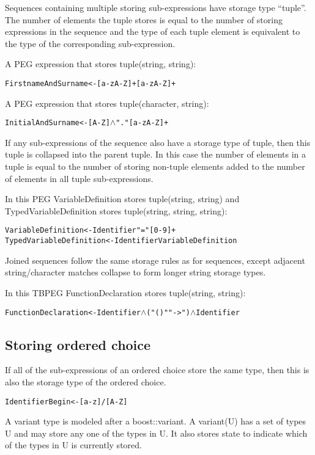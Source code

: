 \documentclass[a4paper,11pt]{article}
\begin{document}
Sequences containing multiple storing sub-expressions have storage type ``tuple''.
The number of elements the tuple stores is equal to the number of storing expressions in the sequence and the type of each tuple element is equivalent to the type of the corresponding sub-expression.

A PEG expression that stores tuple(string, string):
\begin{alltt}
    FirstnameAndSurname <- [a-zA-Z]+ [a-zA-Z]+
\end{alltt}

A PEG expression that stores tuple(character, string):
\begin{alltt}
    InitialAndSurname <- [A-Z] \(\wedge\) "." [a-zA-Z]+
\end{alltt}

If any sub-expressions of the sequence also have a storage type of tuple, then this tuple is collapsed into the parent tuple.
In this case the number of elements in a tuple is equal to the number of storing non-tuple elements added to the number of elements in all tuple sub-expressions.

In this PEG VariableDefinition stores tuple(string, string) and TypedVariableDefinition stores tuple(string, string, string):
\begin{alltt}
    VariableDefinition      <- Identifier "=" [0-9]+
    TypedVariableDefinition <- Identifier VariableDefinition
\end{alltt}

Joined sequences follow the same storage rules as for sequences, except adjacent string/character matches collapse to form longer string storage types.

In  this TBPEG FunctionDeclaration stores tuple(string, string):
\begin{alltt}
    FunctionDeclaration <- Identifier \(\wedge\) ("()"  "->") \(\wedge\) Identifier
\end{alltt}

\subsection{Storing ordered choice}
If all of the sub-expressions of an ordered choice store the same type, then this is also the storage type of the ordered choice.
\begin{alltt}
    IdentifierBegin <- [a-z] / [A-Z]
\end{alltt}

A variant type is modeled after a boost::variant\cite{boostvariant}.
A variant(U) has a set of types U and may store any one of the types in U.
It also stores state to indicate which of the types in U is currently stored.
\end{document}
